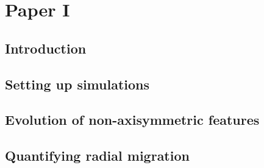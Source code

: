 \chapter{Paper I}\label{chap:paper1}
\section{Introduction}\label{sec:p1-intro}

\section{Setting up simulations}\label{sec:p1-simulations}

\section{Evolution of non-axisymmetric features}\label{sec:p1-evolution}

\section{Quantifying radial migration}\label{sec:p1-quantifying}